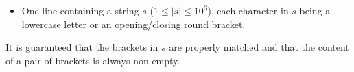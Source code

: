 

\begin{itemize}
  \item One line containing a string $s$ ($1 \le |s| \le 10^6$), each character
        in $s$ being a lowercase letter or an opening/closing round bracket.
\end{itemize}

It is guaranteed that the brackets in $s$ are properly matched and that the
content of a pair of brackets is always non-empty.

